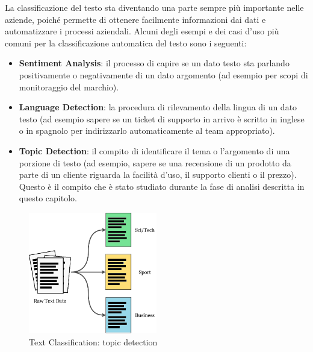 La classificazione del testo sta diventando una parte sempre più importante nelle aziende, poiché permette di ottenere facilmente informazioni dai dati e automatizzare i processi aziendali. Alcuni degli esempi e dei casi d'uso più comuni per la classificazione automatica del testo sono i seguenti:

\begin{itemize}
    \item \textbf{Sentiment Analysis}: il processo di capire se un dato testo sta parlando positivamente o negativamente di un dato argomento (ad esempio per scopi di monitoraggio del marchio).
    \item \textbf{Language Detection}: la procedura di rilevamento della lingua di un dato testo (ad esempio sapere se un ticket di supporto in arrivo è scritto in inglese o in spagnolo per indirizzarlo automaticamente al team appropriato).
    \item \textbf{Topic Detection}: il compito di identificare il tema o l'argomento di una porzione di testo (ad esempio, sapere se una recensione di un prodotto da parte di un cliente riguarda la facilità d'uso, il supporto clienti o il prezzo). Questo è il compito che è stato studiato durante la fase di analisi descritta in questo capitolo.
\end{itemize}

\begin{figure}[hbt!]
    \centering
    \includegraphics[width=0.5\textwidth]{img/textc_example.png}
    \caption{Text Classification: topic detection}
    \label{fig:textc_example}
\end{figure}